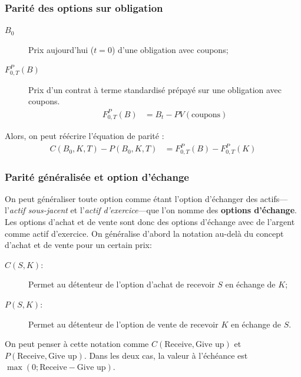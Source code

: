 \documentclass[10pt, french]{article}
\begin{document}
\begin{multicols*}{2}
\subsubsection*{Parité des options sur obligation}
\begin{description}
	\item[$B_{0}$]	Prix aujourd'hui ($t = 0$) d'une obligation avec coupons;
	\item[$F_{0, T}^{P}(B)$]	Prix d'un contrat à terme standardisé prépayé sur une obligation avec coupons.
		\setlength{\mathindent}{-1cm}
		\begin{align*}
		F_{0, T}^{P}(B) 
		&=	B_{t} - PV(\text{coupons})
		\end{align*}
		\setlength{\mathindent}{1cm}
\end{description}

Alors, on peut réécrire l'équation de parité : 
\begin{align*}
	C(B_{0}, K, T) - P(B_{0}, K, T) 
	&= 	F_{0, T}^{P}(B) - F_{0, T}^{P}(K)
\end{align*}

\subsubsection*{Parité généralisée et option d'échange}
On peut généraliser toute option comme étant l'option d'échanger des actifs---l'\textit{actif sous-jacent} et l'\textit{actif d'exercice}---que l'on nomme des \textbf{options d'échange}.\\

Les options d'achat et de vente sont donc des options d'échange avec de l'argent comme actif d'exercice. On généralise d'abord la notation au-delà du concept d'achat et de vente pour un certain prix:
\begin{rappel_enhanced}[Notation]
\begin{description}
	\item[$C(S, K)$:] Permet au détenteur de l'option d'achat de recevoir $S$ en échange de $K$;
	\item[$P(S, K)$:] Permet au détenteur de l'option de vente de recevoir $K$ en échange de $S$.
\end{description}
\end{rappel_enhanced}

On peut penser à cette notation comme $C(\text{Receive}, \text{Give up})$ et $P(\text{Receive}, \text{Give up})$. Dans les deux cas, la valeur à l'échéance est $\max(0; \text{Receive} - \text{Give up})$.


\end{multicols*}
\end{document}
